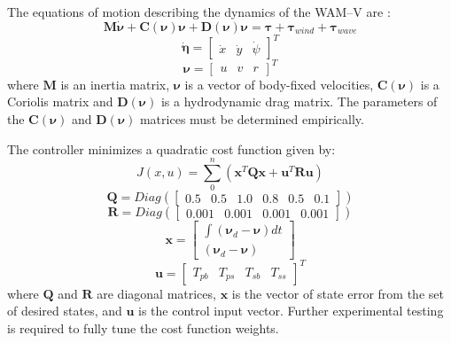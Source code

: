 \documentclass[letterpaper, 12 pt, conference]{ieeeconf}
\begin{document}
The equations of motion describing the dynamics of the WAM--V are \cite{Fossen:94a, Fossen:11a}:
%
\begin{equation}
\label{eq:EOM_No_Current}
\bm{M}\dot{\bm{\nu}} + \bm{C}(\bm{\nu})\bm{\nu} + \bm{D}(\bm{\nu})\bm{\nu} = \bm{\tau} + \bm{\tau}_{wind} + \bm{\tau}_{wave}
\end{equation}
%
%
\begin{equation}
\label{eq:GlobalVelo}
\dot{\bm{\eta}} =
\left[
\begin{matrix}
\dot{x} & \dot{y} & \dot\psi
\end{matrix}
\right]^T
\end{equation}
%
\begin{equation}
\label{eq:BodyVelo}
\bm{\nu} = \left[
\begin{matrix}
u & v & r
\end{matrix}
\right]^T
\end{equation}
%
where $\bm{M}$ is an inertia matrix, $\bm{\nu}$ is a vector of body-fixed velocities, $\bm{C}\left(\bm{\nu}\right)$ is a Coriolis matrix and $\bm{D}\left(\bm{\nu}\right)$ is a hydrodynamic drag matrix. The parameters of the $\bm{C}\left(\bm{\nu}\right)$  and $\bm{D}\left(\bm{\nu}\right)$ matrices must be determined empirically.

The controller minimizes a quadratic cost function given by:
%
\begin{equation}
\label{eq:cost_function}
J\left(x, u\right) = \sum_0^n \left(\bm{x}^T \bm{Q} \bm{x} + \bm{u}^T \bm{R} \bm{u}\right)
\end{equation}
%
\begin{equation}
\label{eq:Q_matrix}
\bm{Q} = Diag\left(\left[
\begin{matrix}
0.5 & 0.5 & 1.0 & 0.8 & 0.5 & 0.1 %
\end{matrix}
\right]
\right)
\end{equation}
%
\begin{equation}
\label{eq:R_matrix}
\bm{R} = Diag\left(\left[
\begin{matrix}
0.001 & 0.001 & 0.001 & 0.001
\end{matrix}
\right]\right)
\end{equation}
%
\begin{equation}
\label{eq:state_vector}
\bm{x} = \left[
\begin{matrix}
\int\left(\bm{\nu}_d - \bm{\nu}\right)dt\\
\left(\bm{\nu}_d - \bm{\nu}\right)
\end{matrix}
\right]
\end{equation}
%
\begin{equation}
\label{eq:control_vector}
\bm{u} = \left[
\begin{matrix}
T_{pb} & T_{ps} & T_{sb} & T_{ss}
\end{matrix}
\right]^T
\end{equation}
%
where $\bm{Q}$ and $\bm{R}$ are diagonal matrices, $\bm{x}$ is the vector of state error from the set of desired states, and $\bm{u}$ is the control input vector. Further experimental testing is required to fully tune the cost function weights. 
\end{document}
